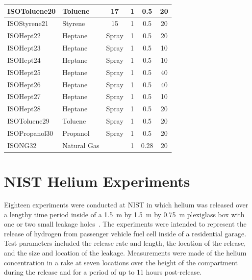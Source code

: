 \begin{table}[p]
\begin{center}
\begin{tabular}{|l|l|c|c|c|c|}
ISOToluene20  &  Toluene      &  17        &  1        &  0.5          &  20               \\ \hline
ISOStyrene21  &  Styrene      &  15        &  1        &  0.5          &  20               \\ \hline
ISOHept22     &  Heptane      &  Spray     &  1        &  0.5          &  20               \\ \hline
ISOHept23     &  Heptane      &  Spray     &  1        &  0.5          &  10               \\ \hline
ISOHept24     &  Heptane      &  Spray     &  1        &  0.5          &  10               \\ \hline
ISOHept25     &  Heptane      &  Spray     &  1        &  0.5          &  40               \\ \hline
ISOHept26     &  Heptane      &  Spray     &  1        &  0.5          &  40               \\ \hline
ISOHept27     &  Heptane      &  Spray     &  1        &  0.5          &  10               \\ \hline
ISOHept28     &  Heptane      &  Spray     &  1        &  0.5          &  20               \\ \hline
ISOToluene29  &  Toluene      &  Spray     &  1        &  0.5          &  20               \\ \hline
ISOPropanol30 &  Propanol     &  Spray     &  1        &  0.5          &  20               \\ \hline
ISONG32       &  Natural Gas  &            &  1        &  0.28         &  20               \\ \hline
\end{tabular}
\end{center}
\label{tab:NIST_FSE_Exp}
\end{table}





\section{NIST Helium Experiments}

Eighteen experiments were conducted at NIST in which helium was released over a lengthy time period inside of a 1.5~m by 1.5~m by 0.75~m plexiglass box with one or two small leakage holes~\cite{Pitts:2011}. The experiments were intended to represent the release of hydrogen from passenger vehicle fuel cell inside of a residential garage. Test parameters included the release rate and length, the location of the release, and the size and location of the leakage. Measurements were made of the helium concentration in a rake at seven locations over the height of the compartment during the release and for a period of up to 11 hours post-release.

